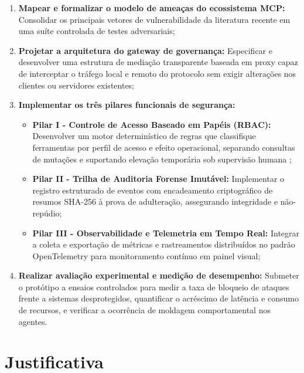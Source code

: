 \begin{enumerate}
  \item \textbf{Mapear e formalizar o modelo de ameaças do ecossistema MCP:} Consolidar os principais vetores de vulnerabilidade da literatura recente \cite{hasan2026mcp,hou2025mcp,jang2026hierarchical,buhler2026agentbound} em uma suíte controlada de testes adversariais;

  \item \textbf{Projetar a arquitetura do gateway de governança:} Especificar e desenvolver uma estrutura de mediação transparente baseada em proxy capaz de interceptar o tráfego local e remoto do protocolo sem exigir alterações nos clientes ou servidores existentes;

  \item \textbf{Implementar os três pilares funcionais de segurança:}
    \begin{itemize}
      \item \textbf{Pilar I - Controle de Acesso Baseado em Papéis (RBAC):} Desenvolver um motor determinístico de regras que classifique ferramentas por perfil de acesso e efeito operacional, separando consultas de mutações e suportando elevação temporária sob supervisão humana \cite{singh2026mcpsecure,zhang2025acfix};
      \item \textbf{Pilar II - Trilha de Auditoria Forense Imutável:} Implementar o registro estruturado de eventos com encadeamento criptográfico de resumos SHA-256 à prova de adulteração, assegurando integridade e não-repúdio;
      \item \textbf{Pilar III - Observabilidade e Telemetria em Tempo Real:} Integrar a coleta e exportação de métricas e rastreamentos distribuídos no padrão OpenTelemetry para monitoramento contínuo em painel visual;
    \end{itemize}

  \item \textbf{Realizar avaliação experimental e medição de desempenho:} Submeter o protótipo a ensaios controlados para medir a taxa de bloqueio de ataques frente a sistemas desprotegidos, quantificar o acréscimo de latência e consumo de recursos, e verificar a ocorrência de moldagem comportamental nos agentes.
\end{enumerate}

\section{Justificativa}
\label{sec:justificativa}


